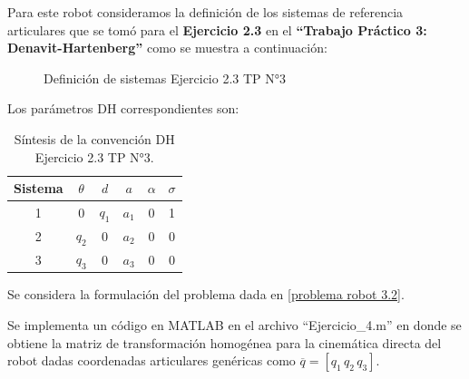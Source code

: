\documentclass[a4paper,12pt]{article}
\begin{document}
Para este robot consideramos la definición de los sistemas de referencia articulares que se tomó para el \textbf{Ejercicio 2.3} en el \textbf{``Trabajo Práctico 3: Denavit-Hartenberg''} como se muestra a continuación:
\begin{figure}[H]
    \centering
    \begin{adjustbox}{scale = 0.66, max width=\columnwidth}
    \end{adjustbox}
    \caption{Definición de sistemas Ejercicio 2.3 TP N°3}
\end{figure}

Los parámetros DH correspondientes son:
\begin{table}[H]
    \centering
    \begin{tabular}{|c|c|c|c|c|c|}
    \hline
    Sistema & $\theta$  & $d$ & $a$         & $\alpha$ & $\sigma$ \\ \hline
    1       & $0$       & $q_1$ & $a_{1}$  & 0      & 1        \\ \hline
    2       & $q_2$     & 0   & $a_{2}$  & 0        & 0        \\ \hline
    3       & $q_3$     & 0   & $a_{3}$  & 0        & 0        \\ \hline
    \end{tabular}
    \caption{Síntesis de la convención DH Ejercicio 2.3 TP N°3.}
\end{table}

Se considera la formulación del problema dada en \cref{problema robot 3.2}.

Se implementa un código en MATLAB en el archivo ``Ejercicio\_4.m'' en donde se obtiene la matriz de transformación homogénea para la cinemática directa del robot dadas coordenadas articulares genéricas como $\overline{q} = \left[q_1\, q_2\, q_3\right]$.
\end{document}

